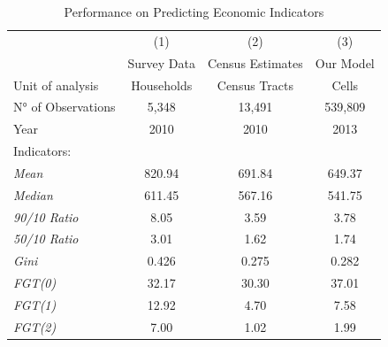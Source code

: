 \documentclass[conference]{IEEEtran}
\begin{document}
\begin{table}[t] 
\caption{Performance on Predicting Economic Indicators} \label{tab:2010_results}
\centering
\begin{tabular}{lccc}
                    \hline  \hline & (1) & (2) & (3)  \\
  & Survey Data & Census Estimates & Our Model  \\ \hline
Unit of analysis                       &  Households          & Census Tracts                        & Cells                \\
N° of Observations                      & 5,348            & 13,491                         & 539,809                      \\
Year                                & 2010           & 2010           & 2013                     \\
Indicators: & & & \\
\;\;\; \textit{Mean}              & 820.94         & 691.84                      & 649.37                    \\
\;\;\; \textit{Median      }      & 611.45         & 567.16                        & 541.75                  \\
\;\;\; \textit{90/10 Ratio }      & 8.05           & 3.59             & 3.78
                       \\
\;\;\; \textit{50/10 Ratio  }     & 3.01           & 1.62             & 1.74
                       \\
\;\;\; \textit{Gini           }    & 0.426           & 0.275             & 0.282                      \\
\;\;\; \textit{FGT(0)}             & 32.17            & 30.30                         & 37.01                       \\
\;\;\; \textit{FGT(1) }            & 12.92           & 4.70           & 7.58                       \\
\;\;\; \textit{FGT(2)  }           & 7.00             & 1.02             & 1.99     \\ \hline       \hline             
\end{tabular}
\end{table}
\end{document}
